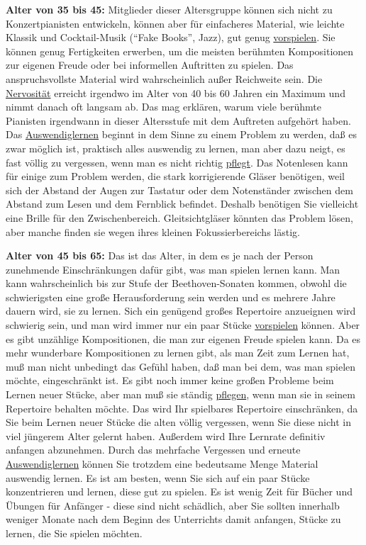 \textbf{Alter von 35 bis 45:}
Mitglieder dieser Altersgruppe können sich nicht zu Konzertpianisten entwickeln, können aber für einfacheres Material, wie leichte Klassik und Cocktail-Musik (\enquote{Fake Books}, Jazz), gut genug \hyperref[c1iii14]{vorspielen}.
Sie können genug Fertigkeiten erwerben, um die meisten berühmten Kompositionen zur eigenen Freude oder bei informellen Auftritten zu spielen.
Das anspruchsvollste Material wird wahrscheinlich außer Reichweite sein.
Die \hyperref[c1iii15]{Nervosität} erreicht irgendwo im Alter von 40 bis 60 Jahren ein Maximum und nimmt danach oft langsam ab. 
Das mag erklären, warum viele berühmte Pianisten irgendwann in dieser Altersstufe mit dem Auftreten aufgehört haben.
Das \hyperref[c1iii6]{Auswendiglernen} beginnt in dem Sinne zu einem Problem zu werden, daß es zwar möglich ist, praktisch alles auswendig zu lernen, man aber dazu neigt, es fast völlig zu vergessen, wenn man es nicht richtig \hyperref[c1iii6c]{pflegt}.
Das Notenlesen kann für einige zum Problem werden, die stark korrigierende Gläser benötigen, weil sich der Abstand der Augen zur Tastatur oder dem Notenständer zwischen dem Abstand zum Lesen und dem Fernblick befindet.
Deshalb benötigen Sie vielleicht eine Brille für den Zwischenbereich.
Gleitsichtgläser könnten das Problem lösen, aber manche finden sie wegen ihres kleinen Fokussierbereichs lästig.


\label{c1iii18c45}

\textbf{Alter von 45 bis 65:}
Das ist das Alter, in dem es je nach der Person zunehmende Einschränkungen dafür gibt, was man spielen lernen kann.
Man kann wahrscheinlich bis zur Stufe der Beethoven-Sonaten kommen, obwohl die schwierigsten eine große Herausforderung sein werden und es mehrere Jahre dauern wird, sie zu lernen.
Sich ein genügend großes Repertoire anzueignen wird schwierig sein, und man wird immer nur ein paar Stücke \hyperref[c1iii14]{vorspielen} können.
Aber es gibt unzählige Kompositionen, die man zur eigenen Freude spielen kann.
Da es mehr wunderbare Kompositionen zu lernen gibt, als man Zeit zum Lernen hat, muß man nicht unbedingt das Gefühl haben, daß man bei dem, was man spielen möchte, eingeschränkt ist.
Es gibt noch immer keine großen Probleme beim Lernen neuer Stücke, aber man muß sie ständig \hyperref[c1iii6c]{pflegen}, wenn man sie in seinem Repertoire behalten möchte.
Das wird Ihr spielbares Repertoire einschränken, da Sie beim Lernen neuer Stücke die alten völlig vergessen, wenn Sie diese nicht in viel jüngerem Alter gelernt haben.
Außerdem wird Ihre Lernrate definitiv anfangen abzunehmen.
Durch das mehrfache Vergessen und erneute \hyperref[c1iii6]{Auswendiglernen} können Sie trotzdem eine bedeutsame Menge Material auswendig lernen.
Es ist am besten, wenn Sie sich auf ein paar Stücke konzentrieren und lernen, diese gut zu spielen.
Es ist wenig Zeit für Bücher und Übungen für Anfänger - diese sind nicht schädlich, aber Sie sollten innerhalb weniger Monate nach dem Beginn des Unterrichts damit anfangen, Stücke zu lernen, die Sie spielen möchten.


